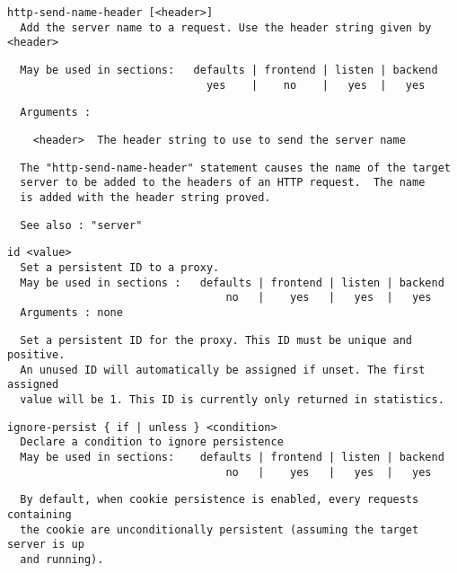 \begin{verbatim}
http-send-name-header [<header>]
  Add the server name to a request. Use the header string given by <header>
\end{verbatim}

\begin{verbatim}
  May be used in sections:   defaults | frontend | listen | backend
                               yes    |    no    |   yes  |   yes
\end{verbatim}

\begin{verbatim}
  Arguments :
\end{verbatim}

\begin{verbatim}
    <header>  The header string to use to send the server name
\end{verbatim}

\begin{verbatim}
  The "http-send-name-header" statement causes the name of the target
  server to be added to the headers of an HTTP request.  The name
  is added with the header string proved.
\end{verbatim}

\begin{verbatim}
  See also : "server"
\end{verbatim}

\begin{verbatim}
id <value>
  Set a persistent ID to a proxy.
  May be used in sections :   defaults | frontend | listen | backend
                                  no   |    yes   |   yes  |   yes
  Arguments : none
\end{verbatim}

\begin{verbatim}
  Set a persistent ID for the proxy. This ID must be unique and positive.
  An unused ID will automatically be assigned if unset. The first assigned
  value will be 1. This ID is currently only returned in statistics.
\end{verbatim}

\begin{verbatim}
ignore-persist { if | unless } <condition>
  Declare a condition to ignore persistence
  May be used in sections:    defaults | frontend | listen | backend
                                  no   |    yes   |   yes  |   yes
\end{verbatim}

\begin{verbatim}
  By default, when cookie persistence is enabled, every requests containing
  the cookie are unconditionally persistent (assuming the target server is up
  and running).
\end{verbatim}

